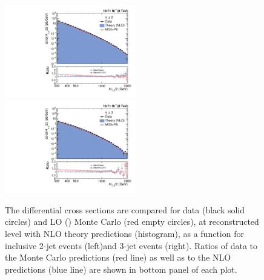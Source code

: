 \begin{figure}[!htbp]
 \begin{center}
 \includegraphics[width=0.51\textwidth]{Plots_HT_2_150/Comparison_all_2_HT_2_150.pdf}%
 ~~\includegraphics[width=0.51\textwidth]{Plots_HT_2_150/Comparison_all_3_HT_2_150.pdf}\\
 \caption{The differential cross sections are compared for data (black solid circles) and LO \MadGraphF \plus \PYTHIAS (\MGP) Monte Carlo (red empty circles), at reconstructed level with NLO theory predictions (histogram), as a function \httwo for inclusive 2-jet events (left)and 3-jet events (right). Ratios of data to the Monte Carlo predictions (red line) as well as to the NLO predictions (blue line) are shown in bottom panel of each plot.}
 \label{fig:comp_all}
 \end{center}
\end{figure}

